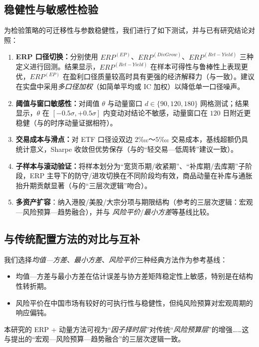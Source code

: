 \documentclass[a4paper,12pt]{article}
\numberwithin{equation}{section}
\begin{document}
\subsection{稳健性与敏感性检验} \label{sec:robustness}
为检验策略的可迁移性与参数稳健性，我们进行了如下测试，并与已有研究结论对照：
\begin{enumerate}
  \item \textbf{ERP 口径切换：}分别使用 $ERP^{(EP)}$、$ERP^{(DivGrow)}$、$ERP^{(Ret-Yield)}$ 三种定义进行回测。结果显示，$ERP^{(Ret-Yield)}$ 在样本可得性与鲁棒性上表现更优，$ERP^{(EP)}$ 在盈利口径质量较高时具有更强的经济解释力（与\cite{Campbell2008,Cochrane2011}一致）。建议在实盘中采用\emph{多口径加权}（如简单平均或 IC 加权）以降低单一口径噪声。
  \item \textbf{阈值与窗口敏感性：}对阈值 $\theta$ 与动量窗口 $d\in\{90,120,180\}$ 网格测试；结果显示，$\theta$ 在 $[-0.5\sigma, +0.5\sigma]$ 内变动对结论不敏感，动量窗口在 $120$ 日附近更稳健（与\cite{Moskowitz2012,Asness2013}的时序动量证据相符）。
  \item \textbf{交易成本与滑点：}对 ETF 口径设双边 $2$‱～$5$‱ 交易成本，基线超额仍具统计意义，Sharpe 收敛但优势保存（与\cite{HT2024_riskparity}的“轻交易—低周转”建议一致）。
  \item \textbf{子样本与滚动验证：}将样本划分为“宽货币期/收紧期”、“补库期/去库期”子阶段，ERP 主导下的防守/进攻切换在不同阶段均有效，商品动量在补库与通胀抬升期贡献显著（与\cite{HT2024_global}的“三层次逻辑”吻合）。
  \item \textbf{多资产扩容}：纳入港股/美股/大宗分项与期限结构（参考\cite{HT2024_global,HT2024_riskparity}的三层次逻辑：宏观—风险预算—趋势融合），并与 \emph{风险平价}/\emph{最小方差}等基线比较\cite{CSC2025_cycle}。
\end{enumerate}

\subsection{与传统配置方法的对比与互补} \label{sec:compare}
我们选择\emph{均值—方差}、\emph{最小方差}、\emph{风险平价}三种经典方法作为参考基线：
\begin{itemize}
  \item 均值—方差与最小方差在估计误差与协方差矩阵稳定性上敏感，特别是在结构性转折期。
  \item 风险平价在中国市场有较好的可执行性与稳健性\cite{CSC2025_cycle,HT2024_riskparity}，但纯风险预算对宏观周期的响应偏钝。
\end{itemize}
本研究的 ERP + 动量方法可视为“\emph{因子择时层}”对传统“\emph{风险预算层}”的增强……这与\cite{HT2024_global}提出的“宏观—风险预算—趋势融合”的三层次逻辑一致。
\end{document}
